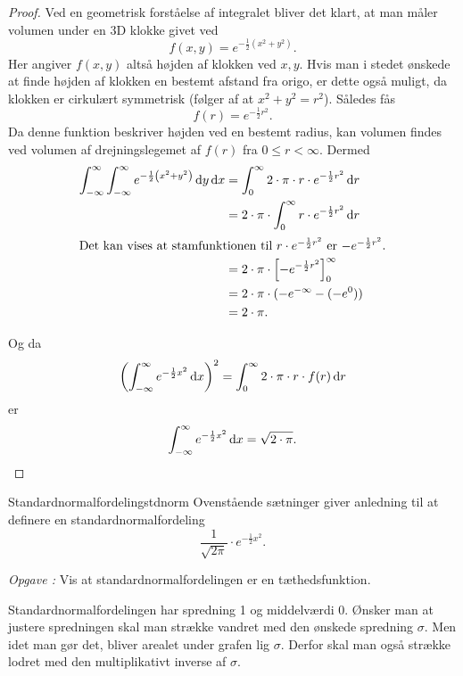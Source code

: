 \documentclass{article}
\newcounter{opgavecnt}
\newcommand{\opg}[1]{\stepcounter{opgavecnt}\textit{Opgave \arabic{opgavecnt}: }#1}
\begin{document}
\begin{proof}
    Ved en geometrisk forståelse af integralet bliver det klart, at man måler
    volumen under en 3D klokke givet ved
    \[
        f(x, y) = e^{-\frac{1}{2} (x^2 + y^2)}.
    \] 
    Her angiver $f(x, y)$ altså højden af klokken ved $x, y$. Hvis man i stedet
    ønskede at finde højden af klokken en bestemt afstand fra origo, er dette
    også muligt, da klokken er cirkulært symmetrisk (følger af at $x^2 + y^2 =
    r^2$). Således fås
    \[
        f(r) = e^{-\frac{1}{2}r^2}.
    \] 
    Da denne funktion beskriver højden ved en bestemt radius, kan volumen
    findes ved volumen af drejningslegemet af $f(r)$ fra $0 \leq r < \infty$.
    Dermed
    \begin{align*}
        \int_{-\infty}^\infty \int_{-\infty}^\infty e^{-\frac{1}{2} \left(x^2+y^2\right)} \,\mathrm{d} y \,\mathrm{d} x &= \int_0^\infty 2 \cdot \pi \cdot r \cdot e^{-\frac{1}{2}r^2} \,\mathrm{d} r\\
            &= 2 \cdot \pi \cdot \int_0^\infty r \cdot e^{-\frac{1}{2}r^2} \,\mathrm{d} r\\
            \intertext{Det kan vises at stamfunktionen til $r \cdot e^{-\frac{1}{2}r^2}$ er $-e^{-\frac{1}{2}r^2}$.}
            &= 2 \cdot \pi \cdot \left[ -e^{-\frac{1}{2}r^2} \right]_0^\infty\\
            &= 2 \cdot \pi \cdot (-e^{-\infty} - (-e^0))\\
            &= 2 \cdot \pi.
    \end{align*}

    Og da 
    \[
        \left(\int_{-\infty}^\infty e^{-\frac{1}{2}x^2} \,\mathrm{d} x\right)^2 = \int_0^\infty 2 \cdot \pi \cdot r \cdot f(r) \,\mathrm{d} r
    \] 
    er 
    \[
        \int_{-\infty}^\infty e^{-\frac{1}{2}x^2} \,\mathrm{d} x = \sqrt{2 \cdot \pi}.\qedhere
    \] 
\end{proof}

\begin{definition}{Standardnormalfordeling}{stdnorm}
    Ovenstående sætninger giver anledning til at definere en
    standardnormalfordeling
    \[
        \frac{1}{\sqrt{2\pi}} \cdot e^{-\frac{1}{2}x^2}.
    \] 
\end{definition}

\opg{Vis at standardnormalfordelingen er en tæthedsfunktion.}

\smallskip

Standardnormalfordelingen har spredning 1 og middelværdi 0. Ønsker man at
justere spredningen skal man strække vandret med den ønskede spredning
$\sigma$. Men idet man gør det, bliver arealet under grafen lig $\sigma$.
Derfor skal man også strække lodret med den multiplikativt inverse af $\sigma$.
\end{document}
